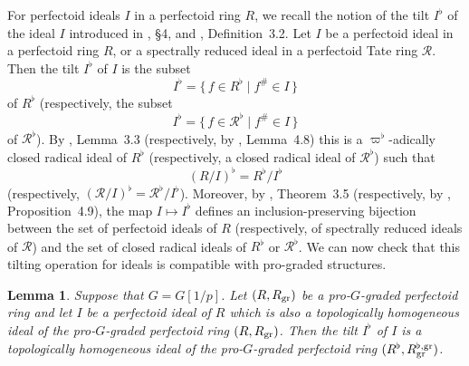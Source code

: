 \documentclass[12pt,twoside,a4paper]{article}
\newtheorem{lemma}[thm]{Lemma}
\theoremstyle{definition}
\theoremstyle{remark}
\newcommand\gr{{\rm gr}}
\begin{document}
For perfectoid ideals $I$ in a perfectoid ring $R$, we recall the notion of the tilt $I^{\flat}$ of the ideal $I$ introduced in \cite{Dine22}, \S4, and \cite{Dine-Ishizuka23}, Definition~3.2. Let $I$ be a perfectoid ideal in a perfectoid ring $R$, or a spectrally reduced ideal in a perfectoid Tate ring $\mathcal{R}$. Then the tilt $I^{\flat}$ of $I$ is the subset \begin{equation*}I^{\flat}=\{\, f\in R^{\flat}\mid f^{\#}\in I\,\}\end{equation*}of $R^{\flat}$ (respectively, the subset \begin{equation*}I^{\flat}=\{\, f\in \mathcal{R}^{\flat}\mid f^{\#}\in I\,\}\end{equation*}of $\mathcal{R}^{\flat}$). By \cite{Dine-Ishizuka23}, Lemma~3.3 (respectively, by \cite{Dine22}, Lemma~4.8) this is a $\varpi^{\flat}$-adically closed radical ideal of $R^{\flat}$ (respectively, a closed radical ideal of $\mathcal{R}^{\flat}$) such that \begin{equation*}(R/I)^{\flat}=R^{\flat}/I^{\flat} \end{equation*}(respectively, $(\mathcal{R}/I)^{\flat}=\mathcal{R}^{\flat}/I^{\flat}$). Moreover, by \cite{Dine-Ishizuka23}, Theorem~3.5 (respectively, by \cite{Dine22}, Proposition~4.9), the map $I\mapsto I^{\flat}$ defines an inclusion-preserving bijection between the set of perfectoid ideals of $R$ (respectively, of spectrally reduced ideals of $\mathcal{R}$) and the set of closed radical ideals of $R^{\flat}$ or $\mathcal{R}^{\flat}$. We can now check that this tilting operation for ideals is compatible with pro-graded structures. 
\begin{lemma}\label{Homogeneous ideals and tilting}Suppose that $G=G[1/p]$. Let $(R, R_{\gr})$ be a pro-$G$-graded perfectoid ring and let $I$ be a perfectoid ideal of $R$ which is also a topologically homogeneous ideal of the pro-$G$-graded perfectoid ring $(R, R_{\gr})$. Then the tilt $I^{\flat}$ of $I$ is a topologically homogeneous ideal of the pro-$G$-graded perfectoid ring $(R^{\flat}, R_{\gr}^{\flat,\gr})$. \end{lemma}
\end{document}
